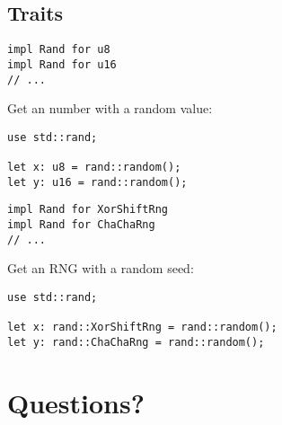 \documentclass[14pt]{beamer}
\begin{document}
\subsection{Traits}
\begin{frame}[fragile]
  \begin{verbatim}
impl Rand for u8
impl Rand for u16
// ...
  \end{verbatim}

Get an number with a random value:

  \begin{verbatim}
use std::rand;

let x: u8 = rand::random();
let y: u16 = rand::random();
  \end{verbatim}
\end{frame}
\begin{frame}[fragile]
  \begin{verbatim}
impl Rand for XorShiftRng
impl Rand for ChaChaRng
// ...
  \end{verbatim}

Get an RNG with a random seed:

  \begin{verbatim}
use std::rand;

let x: rand::XorShiftRng = rand::random();
let y: rand::ChaChaRng = rand::random();
  \end{verbatim}
\end{frame}
\section{Questions?}
\end{document}
